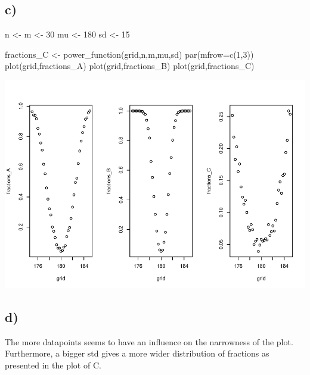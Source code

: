 \documentclass[
]{article}
\newenvironment{Shaded}{\begin{snugshade}}{\end{snugshade}}
\newcommand{\AttributeTok}[1]{\textcolor[rgb]{0.77,0.63,0.00}{#1}}
\newcommand{\DecValTok}[1]{\textcolor[rgb]{0.00,0.00,0.81}{#1}}
\newcommand{\FunctionTok}[1]{\textcolor[rgb]{0.00,0.00,0.00}{#1}}
\newcommand{\NormalTok}[1]{#1}
\newcommand{\OtherTok}[1]{\textcolor[rgb]{0.56,0.35,0.01}{#1}}
\begin{document}
\hypertarget{c}{%
\subsection{c)}\label{c}}

\begin{Shaded}
\begin{Highlighting}[]
\NormalTok{n }\OtherTok{\textless{}{-}}\NormalTok{ m }\OtherTok{\textless{}{-}} \DecValTok{30}
\NormalTok{mu }\OtherTok{\textless{}{-}} \DecValTok{180}
\NormalTok{sd }\OtherTok{\textless{}{-}} \DecValTok{15}

\NormalTok{fractions\_C }\OtherTok{\textless{}{-}} \FunctionTok{power\_function}\NormalTok{(grid,n,m,mu,sd)}
\FunctionTok{par}\NormalTok{(}\AttributeTok{mfrow=}\FunctionTok{c}\NormalTok{(}\DecValTok{1}\NormalTok{,}\DecValTok{3}\NormalTok{))}
\FunctionTok{plot}\NormalTok{(grid,fractions\_A)}
\FunctionTok{plot}\NormalTok{(grid,fractions\_B)}
\FunctionTok{plot}\NormalTok{(grid,fractions\_C)}
\end{Highlighting}
\end{Shaded}

\includegraphics{Assignment-1_files/figure-latex/unnamed-chunk-6-1.pdf}

\hypertarget{d}{%
\subsection{d)}\label{d}}

The more datapoints seems to have an influence on the narrowness of the
plot. Furthermore, a bigger std gives a more wider distribution of
fractions as presented in the plot of C.
\end{document}
